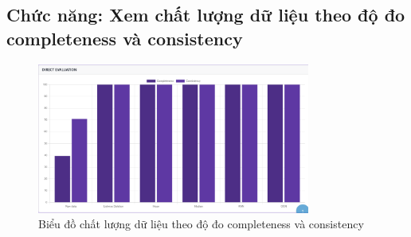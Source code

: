 \subsection{Chức năng: Xem chất lượng dữ liệu theo độ đo completeness và consistency}
\begin{figure}[H]
    \centering
    \includegraphics[width = 0.8\textwidth]{imgs/demo-12.png}
    \caption{Biểu đồ chất lượng dữ liệu theo độ đo completeness và consistency}
    \label{fig:demo-12}
\end{figure}
